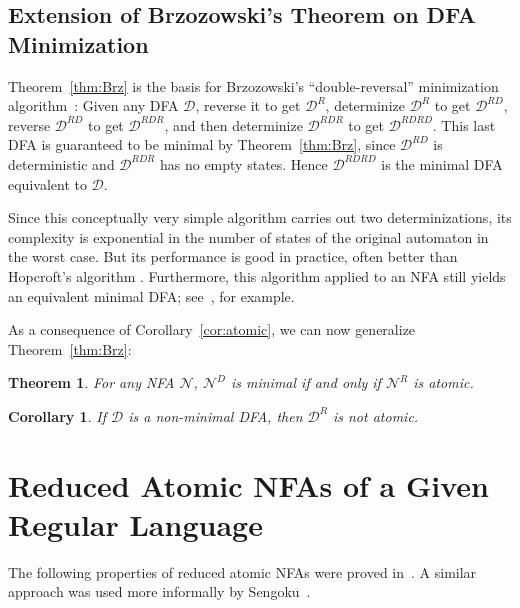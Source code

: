 \documentclass[preprint,12pt]{elsarticle}
\newcommand{\cD}{{\mathcal D}}
\newcommand{\cN}{{\mathcal N}}
\newcommand{\rev}{R}
\newcommand{\deter}{D}
\newtheorem{theorem}{Theorem}
\newtheorem{corollary}{Corollary}
\begin{document}
\subsection{Extension of Brzozowski's Theorem on DFA Minimization}
\label{sec:extension}

Theorem~\ref{thm:Brz} is the basis for Brzozowski's ``double-reversal'' 
minimization algorithm~\cite{Brz63}:
Given any DFA $\cD$, reverse it to get $\cD^{\rev}$, determinize 
$\cD^{\rev}$ to get $\cD^{\rev\deter}$, reverse $\cD^{\rev\deter}$ to get 
$\cD^{\rev\deter\rev}$, and then determinize $\cD^{\rev\deter\rev}$ to get 
$\cD^{\rev\deter\rev\deter}$. This last DFA is guaranteed to be minimal 
by Theorem~\ref{thm:Brz}, since $\cD^{\rev\deter}$ is deterministic and
$\cD^{\rev\deter\rev}$ has no empty states.
Hence $\cD^{\rev\deter\rev\deter}$ is the minimal DFA equivalent to $\cD$.


Since this conceptually very simple algorithm carries out two 
determinizations, its complexity is exponential in the number of states 
of the original automaton in the worst case. But its 
performance is good in practice, often better than Hopcroft's 
algorithm \cite{TaV05,Wat95}.
Furthermore, this algorithm applied to an NFA still yields an equivalent 
minimal DFA; see~\cite{Wat95}, for example.



As a consequence  of Corollary~\ref{cor:atomic}, we can now generalize 
Theorem~\ref{thm:Brz}:

\begin{theorem}
\label{thm:extension}
For any NFA $\cN$,  $\cN^\deter$ is minimal if and only if $\cN^\rev$ is atomic. 
\end{theorem}

\begin{corollary}
If $\cD$ is a non-minimal  DFA, then $\cD^\rev$ is not atomic. 
\end{corollary}



\section{Reduced Atomic NFAs of a Given Regular Language}
\label{sec:reduced}

The following properties of reduced atomic NFAs were proved in~\cite{BrTa13}. 
A similar approach was used more informally by Sengoku~\cite{Sen92}.
\end{document}
